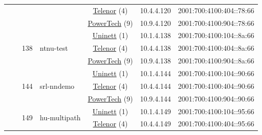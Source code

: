 \begin{small}
\begin{center}
\begin{longtable}{|c|c|c|c|c|c|c|c|}
  &  &  &  & \multicolumn{2}{|c|}{\tiny{\href{https://www.telenor.no}{Telenor} (4)}} & \tiny{10.4.4.120} & \tiny{2001:700:4100:404::78:66} \\* \cline{5-5}\cline{6-6}\cline{7-7}\cline{8-8}
  &  &  &  & \multicolumn{2}{|c|}{\tiny{\href{http://www.powertech.no}{PowerTech} (9)}} & \tiny{10.9.4.120} & \tiny{2001:700:4100:904::78:66} \\* \cline{3-3}\cline{4-4}\cline{5-5}\cline{6-6}\cline{7-7}\cline{8-8}
  &  & \multirow{3}{*}{\tiny{138}} & \multicolumn{1}{|l|}{\multirow{3}{*}{\tiny{ntnu-test}}} & \multicolumn{2}{|c|}{\tiny{\href{https://www.uninett.no}{Uninett} (1)}} & \tiny{10.1.4.138} & \tiny{2001:700:4100:104::8a:66} \\* \cline{5-5}\cline{6-6}\cline{7-7}\cline{8-8}
  &  &  &  & \multicolumn{2}{|c|}{\tiny{\href{https://www.telenor.no}{Telenor} (4)}} & \tiny{10.4.4.138} & \tiny{2001:700:4100:404::8a:66} \\* \cline{5-5}\cline{6-6}\cline{7-7}\cline{8-8}
  &  &  &  & \multicolumn{2}{|c|}{\tiny{\href{http://www.powertech.no}{PowerTech} (9)}} & \tiny{10.9.4.138} & \tiny{2001:700:4100:904::8a:66} \\* \cline{3-3}\cline{4-4}\cline{5-5}\cline{6-6}\cline{7-7}\cline{8-8}
  &  & \multirow{3}{*}{\tiny{144}} & \multicolumn{1}{|l|}{\multirow{3}{*}{\tiny{srl-nndemo}}} & \multicolumn{2}{|c|}{\tiny{\href{https://www.uninett.no}{Uninett} (1)}} & \tiny{10.1.4.144} & \tiny{2001:700:4100:104::90:66} \\* \cline{5-5}\cline{6-6}\cline{7-7}\cline{8-8}
  &  &  &  & \multicolumn{2}{|c|}{\tiny{\href{https://www.telenor.no}{Telenor} (4)}} & \tiny{10.4.4.144} & \tiny{2001:700:4100:404::90:66} \\* \cline{5-5}\cline{6-6}\cline{7-7}\cline{8-8}
  &  &  &  & \multicolumn{2}{|c|}{\tiny{\href{http://www.powertech.no}{PowerTech} (9)}} & \tiny{10.9.4.144} & \tiny{2001:700:4100:904::90:66} \\* \cline{3-3}\cline{4-4}\cline{5-5}\cline{6-6}\cline{7-7}\cline{8-8}
  &  & \multirow{3}{*}{\tiny{149}} & \multicolumn{1}{|l|}{\multirow{3}{*}{\tiny{hu-multipath}}} & \multicolumn{2}{|c|}{\tiny{\href{https://www.uninett.no}{Uninett} (1)}} & \tiny{10.1.4.149} & \tiny{2001:700:4100:104::95:66} \\* \cline{5-5}\cline{6-6}\cline{7-7}\cline{8-8}
  &  &  &  & \multicolumn{2}{|c|}{\tiny{\href{https://www.telenor.no}{Telenor} (4)}} & \tiny{10.4.4.149} & \tiny{2001:700:4100:404::95:66} \\* \cline{5-5}\cline{6-6}\cline{7-7}\cline{8-8}

\end{longtable}
\end{center}
\end{small}

